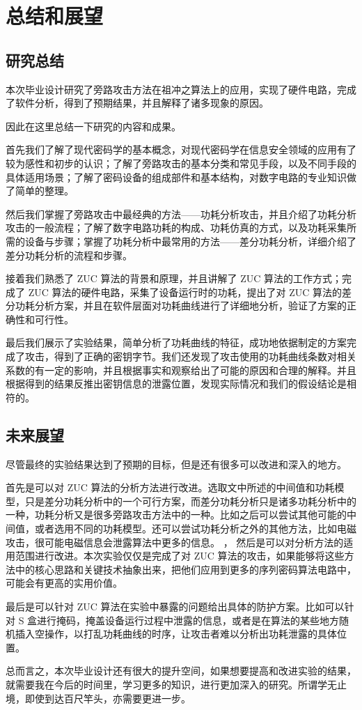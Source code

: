 
\chapter{总结和展望}

\label{chap:conclusion}

\section{研究总结}

本次毕业设计研究了旁路攻击方法在祖冲之算法上的应用，实现了硬件电路，完成了软件分析，得到了预期结果，并且解释了诸多现象的原因。

因此在这里总结一下研究的内容和成果。

首先我们了解了现代密码学的基本概念，对现代密码学在信息安全领域的应用有了较为感性和初步的认识；了解了旁路攻击的基本分类和常见手段，以及不同手段的具体适用场景；了解了密码设备的组成部件和基本结构，对数字电路的专业知识做了简单的整理。

然后我们掌握了旁路攻击中最经典的方法——功耗分析攻击，并且介绍了功耗分析攻击的一般流程；了解了数字电路功耗的构成、功耗仿真的方式，以及功耗采集所需的设备与步骤；掌握了功耗分析中最常用的方法——差分功耗分析，详细介绍了差分功耗分析的流程和步骤。

接着我们熟悉了 ZUC 算法的背景和原理，并且讲解了 ZUC 算法的工作方式；完成了 ZUC 算法的硬件电路，采集了设备运行时的功耗，提出了对 ZUC 算法的差分功耗分析方案，并且在软件层面对功耗曲线进行了详细地分析，验证了方案的正确性和可行性。

最后我们展示了实验结果，简单分析了功耗曲线的特征，成功地依据制定的方案完成了攻击，得到了正确的密钥字节。我们还发现了攻击使用的功耗曲线条数对相关系数的有一定的影响，并且根据事实和观察给出了可能的原因和合理的解释。并且根据得到的结果反推出密钥信息的泄露位置，发现实际情况和我们的假设结论是相符的。

\section{未来展望}

尽管最终的实验结果达到了预期的目标，但是还有很多可以改进和深入的地方。

首先是可以对 ZUC 算法的分析方法进行改进。选取文中所述的中间值和功耗模型，只是差分功耗分析中的一个可行方案，而差分功耗分析只是诸多功耗分析中的一种，功耗分析又是很多旁路攻击方法中的一种。比如之后可以尝试其他可能的中间值，或者选用不同的功耗模型。还可以尝试功耗分析之外的其他方法，比如电磁攻击，很可能电磁信息会泄露算法中更多的信息。
，
然后是可以对分析方法的适用范围进行改进。本次实验仅仅是完成了对 ZUC 算法的攻击，如果能够将这些方法中的核心思路和关键技术抽象出来，把他们应用到更多的序列密码算法电路中，可能会有更高的实用价值。

最后是可以针对 ZUC 算法在实验中暴露的问题给出具体的防护方案。比如可以针对 S 盒进行掩码，掩盖设备运行过程中泄露的信息，或者是在算法的某些地方随机插入空操作，以打乱功耗曲线的时序，让攻击者难以分析出功耗泄露的具体位置。

总而言之，本次毕业设计还有很大的提升空间，如果想要提高和改进实验的结果，就需要我在今后的时间里，学习更多的知识，进行更加深入的研究。所谓学无止境，即使到达百尺竿头，亦需要更进一步。
